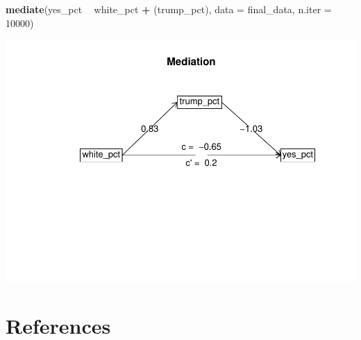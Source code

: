 \documentclass[
]{article}
\newenvironment{Shaded}{\begin{snugshade}}{\end{snugshade}}
\newcommand{\DataTypeTok}[1]{\textcolor[rgb]{0.13,0.29,0.53}{#1}}
\newcommand{\DecValTok}[1]{\textcolor[rgb]{0.00,0.00,0.81}{#1}}
\newcommand{\KeywordTok}[1]{\textcolor[rgb]{0.13,0.29,0.53}{\textbf{#1}}}
\newcommand{\NormalTok}[1]{#1}
\newcommand{\OperatorTok}[1]{\textcolor[rgb]{0.81,0.36,0.00}{\textbf{#1}}}
\newcommand{\StringTok}[1]{\textcolor[rgb]{0.31,0.60,0.02}{#1}}
\begin{document}
\begin{Shaded}
\begin{Highlighting}[]
\KeywordTok{mediate}\NormalTok{(yes_pct }\OperatorTok{~}\StringTok{ }\NormalTok{white_pct }\OperatorTok{+}\StringTok{ }\NormalTok{(trump_pct), }\DataTypeTok{data =}\NormalTok{ final_data, }\DataTypeTok{n.iter =} \DecValTok{10000}\NormalTok{)}
\end{Highlighting}
\end{Shaded}

\includegraphics{Zhong_paper_files/figure-latex/unnamed-chunk-3-1.pdf}

\hypertarget{references}{%
\section{References}\label{references}}
\end{document}
